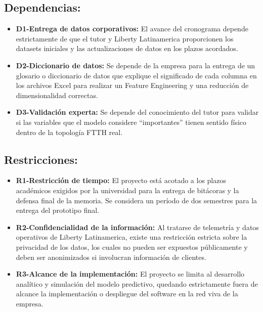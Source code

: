 \documentclass[12pt,a4paper]{article}
\begin{document}
        \subsection{\textbf{Dependencias:}}
                    \begin{itemize}
                        \item \textbf{D1-Entrega de datos corporativos:} El avance del cronograma depende estrictamente de que el tutor y Liberty Latinamerica proporcionen los datasets iniciales y las actualizaciones de datos en los plazos acordados.
                        \item \textbf{D2-Diccionario de datos:} Se depende de la empresa para la entrega de un glosario o diccionario de datos que explique el significado de cada columna en los archivos Excel para realizar un Feature Engineering y una reducción de dimensionalidad correctas.
                        \item \textbf{D3-Validación experta:} Se depende del conocimiento del tutor para validar si las variables que el modelo considere ``importantes'' tienen sentido físico dentro de la topología FTTH real.
                    \end{itemize}
        \subsection{\textbf{Restricciones:}} 
                    \begin{itemize}
                        \item \textbf{R1-Restricción de tiempo:} El proyecto está acotado a los plazos académicos exigidos por la universidad para la entrega de bitácoras y la defensa final de la memoria. Se considera un período de dos semestres para la entrega del prototipo final.
                        \item \textbf{R2-Confidencialidad de la información:} Al tratarse de telemetría y datos operativos de Liberty Latinamerica, existe una restricción estricta sobre la privacidad de los datos, los cuales no pueden ser expuestos públicamente y deben ser anonimizados si involucran información de clientes.
                        \item \textbf{R3-Alcance de la implementación:} El proyecto se limita al desarrollo analítico y simulación del modelo predictivo, quedando estrictamente fuera de alcance la implementación o despliegue del software en la red viva de la empresa.
                    \end{itemize}
\end{document}
